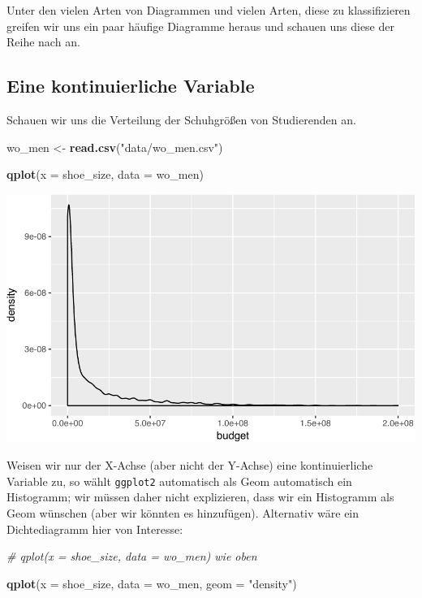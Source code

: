 \documentclass[12pt,]{book}
\newenvironment{Shaded}{\begin{snugshade}}{\end{snugshade}}
\newcommand{\KeywordTok}[1]{\textcolor[rgb]{0.13,0.29,0.53}{\textbf{{#1}}}}
\newcommand{\DataTypeTok}[1]{\textcolor[rgb]{0.13,0.29,0.53}{{#1}}}
\newcommand{\StringTok}[1]{\textcolor[rgb]{0.31,0.60,0.02}{{#1}}}
\newcommand{\CommentTok}[1]{\textcolor[rgb]{0.56,0.35,0.01}{\textit{{#1}}}}
\newcommand{\NormalTok}[1]{{#1}}
\begin{document}
Unter den vielen Arten von Diagrammen und vielen Arten, diese zu
klassifizieren greifen wir uns ein paar häufige Diagramme heraus und
schauen uns diese der Reihe nach an.

\subsection{Eine kontinuierliche
Variable}\label{eine-kontinuierliche-variable}

Schauen wir uns die Verteilung der Schuhgrößen von Studierenden an.

\begin{Shaded}
\begin{Highlighting}[]
\NormalTok{wo_men <-}\StringTok{ }\KeywordTok{read.csv}\NormalTok{(}\StringTok{"data/wo_men.csv"}\NormalTok{)}

\KeywordTok{qplot}\NormalTok{(}\DataTypeTok{x =} \NormalTok{shoe_size, }\DataTypeTok{data =} \NormalTok{wo_men)}
\end{Highlighting}
\end{Shaded}

\begin{center}\includegraphics[width=0.7\linewidth]{050_Daten_visualisieren_files/figure-latex/unnamed-chunk-9-1} \end{center}

Weisen wir nur der X-Achse (aber nicht der Y-Achse) eine kontinuierliche
Variable zu, so wählt \texttt{ggplot2} automatisch als Geom automatisch
ein Histogramm; wir müssen daher nicht explizieren, dass wir ein
Histogramm als Geom wünschen (aber wir könnten es hinzufügen).
Alternativ wäre ein Dichtediagramm hier von Interesse:

\begin{Shaded}
\begin{Highlighting}[]
\CommentTok{# qplot(x = shoe_size, data = wo_men)  wie oben}

\KeywordTok{qplot}\NormalTok{(}\DataTypeTok{x =} \NormalTok{shoe_size, }\DataTypeTok{data =} \NormalTok{wo_men, }\DataTypeTok{geom =} \StringTok{"density"}\NormalTok{)}
\end{Highlighting}
\end{Shaded}
\end{document}

